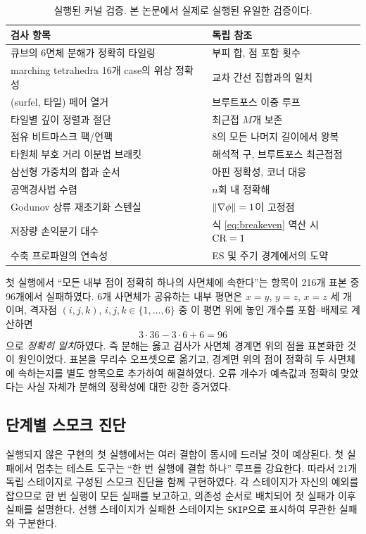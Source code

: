 \begin{table}[htbp]
\centering
\small
\caption{실행된 커널 검증. 본 논문에서 실제로 실행된 유일한 검증이다.}
\label{tab:kernel-checks}
\begin{tabular}{@{}p{6.2cm}p{7.2cm}@{}}
\toprule
검사 항목 & 독립 참조 \\
\midrule
큐브의 6면체 분해가 정확히 타일링 & 부피 합, 점 포함 횟수 \\
marching tetrahedra 16개 case의 위상 정확성 & 교차 간선 집합과의 일치 \\
(surfel, 타일) 페어 열거 & 브루트포스 이중 루프 \\
타일별 깊이 정렬과 절단 & 최근접 $M$개 보존 \\
점유 비트마스크 팩/언팩 & 8의 모든 나머지 길이에서 왕복 \\
타원체 부호 거리 이분법 브래킷 & 해석적 구, 브루트포스 최근접점 \\
삼선형 가중치의 합과 순서 & 아핀 정확성, 코너 대응 \\
공액경사법 수렴 & $n$회 내 정확해 \\
Godunov 상류 재초기화 스텐실 & $\left\lVert \nabla\phi \right\rVert=1$이 고정점 \\
저장량 손익분기 대수 & 식 \eqref{eq:breakeven} 역산 시 $\mathrm{CR}=1$ \\
수축 프로파일의 연속성 & ES 및 주기 경계에서의 도약 \\
\bottomrule
\end{tabular}
\end{table}

\begin{remark}
첫 실행에서 ``모든 내부 점이 정확히 하나의 사면체에 속한다''는 항목이 216개 표본 중
96개에서 실패하였다. 6개 사면체가 공유하는 내부 평면은 $x=y$, $y=z$, $x=z$ 세 개이며,
격자점 $(i,j,k)$, $i,j,k\in\{1,\dots,6\}$ 중 이 평면 위에 놓인 개수를 포함--배제로
계산하면
\[
  3\cdot36 - 3\cdot6 + 6 = 96
\]
으로 \emph{정확히 일치}하였다. 즉 분해는 옳고 검사가 사면체 경계면 위의 점을
표본화한 것이 원인이었다. 표본을 무리수 오프셋으로 옮기고, 경계면 위의 점이 정확히
두 사면체에 속하는지를 별도 항목으로 추가하여 해결하였다. 오류 개수가 예측값과
정확히 맞았다는 사실 자체가 분해의 정확성에 대한 강한 증거였다.
\end{remark}

\subsection{단계별 스모크 진단}

실행되지 않은 구현의 첫 실행에서는 여러 결함이 동시에 드러날 것이 예상된다. 첫 실패에서
멈추는 테스트 도구는 ``한 번 실행에 결함 하나'' 루프를 강요한다. 따라서 21개 독립
스테이지로 구성된 스모크 진단을 함께 구현하였다. 각 스테이지가 자신의 예외를 잡으므로
한 번 실행이 모든 실패를 보고하고, 의존성 순서로 배치되어 첫 실패가 이후 실패를 설명한다.
선행 스테이지가 실패한 스테이지는 \texttt{SKIP}으로 표시하여 무관한 실패와 구분한다.

